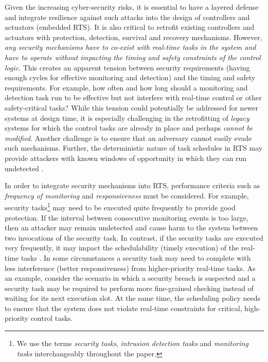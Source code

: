\documentclass[../rt_server_main.tex]{subfiles}
\begin{document}
Given the
increasing cyber-security risks, it is essential to have a layered
defense and integrate resilience against such attacks into the design of
controllers and actuators (\ie embedded RTS). It is
also critical to retrofit existing controllers and actuators with protection,
detection, survival and recovery mechanisms. However, \textit{any security mechanisms have to co-exist with real-time tasks in
the system and have to operate without impacting the timing and safety
constraints of the control logic}. This creates an apparent tension between
security requirements (\eg having enough cycles for effective monitoring and 
detection) and the timing and safety requirements. For example, how often and
how long should a monitoring and detection task run to be effective but not
interfere with real-time control or other safety-critical tasks? While this
tension could potentially be addressed for newer systems at design time, it
is especially challenging in the retrofitting of \textit{legacy} systems for which the control
tasks are already in place and perhaps \textit{cannot be modified}. %
Another challenge
is to ensure that an adversary
cannot easily evade such mechanisms. Further, the deterministic nature of task
schedules in RTS may provide attackers with known windows of opportunity
in which they can run undetected \cite{cy_side_channel,taskshuffler}. 

In order to integrate security mechanisms into RTS, performance criteria such as \textit{frequency of monitoring} and \textit{responsiveness} must be considered. %
For example, security tasks\footnote{We use the terms \textit{security tasks}, \textit{intrusion detection tasks} and \textit{monitoring tasks} interchangeably throughout the paper.} may need to be executed quite frequently to provide good protection. If the interval between consecutive monitoring events is too large, then an attacker may remain undetected and cause harm to the system between two invocations of the security task. In contrast, if the security tasks are executed very frequently, it may impact the schedulability (\ie timely execution) of the real-time tasks \cite{sibin_deeply}. In some circumstances a security task may need to complete with less interference (\eg better responsiveness) from higher-priority real-time tasks. As an example, consider the scenario in which a security breach is suspected and a security task may be required to perform more fine-grained checking instead of waiting for its next  execution slot. At the same time, the scheduling policy needs to ensure that the system does not violate real-time constraints for critical, high-priority control tasks. 
\end{document}
